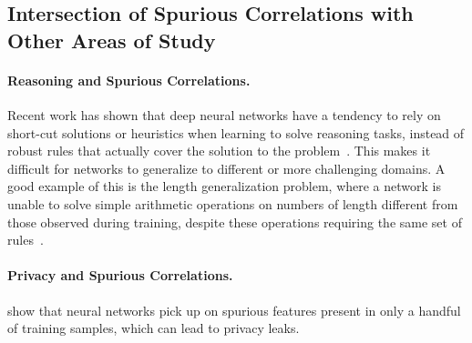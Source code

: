 
\subsection{Intersection of Spurious Correlations with Other Areas of Study}

\paragraph{Reasoning and Spurious Correlations. } Recent work has shown that deep neural networks have a tendency to rely on short-cut solutions or heuristics when learning to solve reasoning tasks, instead of robust rules that actually cover the solution to the problem~\cite{Zhang2023IJCAI,nikankin2025ICLR}. This makes it difficult for networks to generalize to different or more challenging domains. A good example of this is the length generalization problem, where a network is unable to solve simple arithmetic operations on numbers of length different from those observed during training, despite these operations requiring the same set of rules~\cite{Zhou2024ICLR,lee2024ICLR}.

\paragraph{Privacy and Spurious Correlations.   } \cite{yang2022} show that neural networks pick up on spurious features present in only a handful of training samples, which can lead to privacy leaks.
